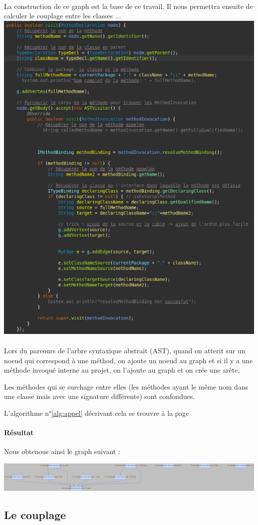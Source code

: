 \documentclass[a4paper]{article}
\begin{document}
\begin{multicols}{2}
        \paragraph{} La construction de ce graph est la base de ce travail. Il nous permettra ensuite de calculer le couplage entre les classes ...
        \includegraphics[height=.585\textwidth]{appel/code}
        \paragraph{}
        Lors du parcours de l'arbre syntaxique abstrait (AST), quand on atterit sur un noeud qui correspond à une méthod, on ajoute un noeud au graph et si il y a une méthode invoqué interne au projet, on l'ajoute au graph et on crée une arête.

        Les méthodes qui se surchage entre elles (les méthodes ayant le même nom dans une classe mais avec une signature différente) sont confondues.

        L'algorithme n°\ref{alg:appel} décrivant cela se trouvre à la page \pageref{alg:appel} 

        \paragraph{Résultat} Nous obtenous ainsi le graph suivant :

        \noindent\includegraphics[width=.7\textwidth]{appel/graphAppelShort}
        \subsection{Le couplage}

\end{multicols}
\end{document}
